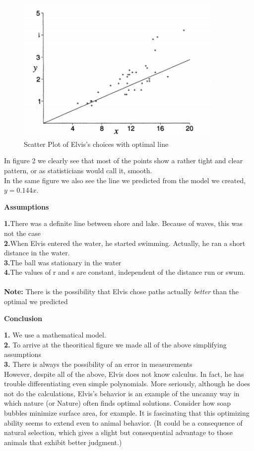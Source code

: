\documentclass[12pt]{article}
\begin{document}
{  \begin{center}
\begin{figure}[h!]
  \includegraphics[width=100mm]{ElvisChoice.png}
  \caption{Scatter Plot of Elvis's choices with optimal line}
  \label{fig:path3}
	\end{figure}
  \end{center}

In figure 2 we clearly see that most of the points show a rather tight and clear pattern, or as statisticians would call it, smooth. \\In the same figure we also see the line we predicted from the model we created, $y = 0.144x.$ \newpage
\begin{center}
\textbf{Assumptions}\\
\end{center}
\textbf{1.}There was a definite line between shore and lake. Because of waves, this
was not the case\\
\textbf{2.}When Elvis entered the water, he started swimming. Actually, he
ran a short distance in the water.\\
\textbf{3.}The ball was stationary in the water\\
\textbf{4.}The values of r and s are constant, independent of the distance run
or swum.\\ \\
\textbf{Note:} There is the possibility that Elvis chose paths actually \textit{better} than the optimal we predicted\\
\begin{center}
\textbf{Conclusion}\\
\end{center}
\textbf{1.} We use a mathematical model.\\
\textbf{2.} To arrive at the theoritical figure we made all of the above simplifying assumptions\\
\textbf{3.} There is always the possibility of an error in measurements\\

However, despite all of the above, Elvis does not know calculus. In fact, he has trouble differentiating even simple polynomials. More seriously,
although he does not do the calculations, Elvis's behavior is an example of the uncanny way in which nature (or Nature) often finds optimal solutions. Consider how
soap bubbles minimize surface area, for example. It is fascinating that this optimizing
ability seems to extend even to animal behavior. (It could be a consequence of natural selection, which gives a slight but consequential advantage to those animals that
exhibit better judgment.) 
}
\end{document}
